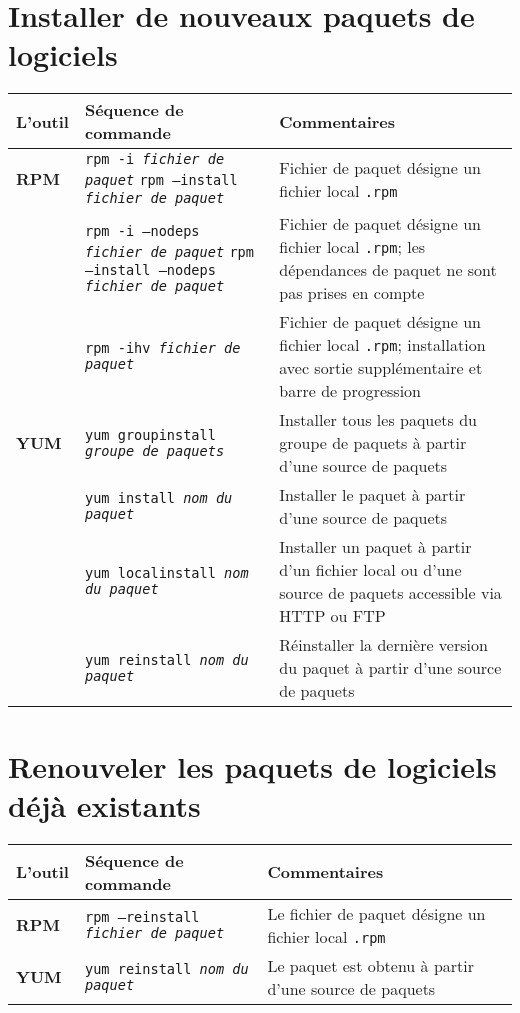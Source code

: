 \documentclass[10pt,a4paper]{article}
\newcommand{\tabellenkopf}{
  \textbf{L'outil} & \textbf{Séquence de commande} & \textbf{Commentaires} \\
}
\begin{document}
\cheatsheet

\section{Installer de nouveaux paquets de logiciels}
\begin{tabular}{ p{3.5cm} p{9cm} p{11cm}}
  \hline
  \rowcolor{Gray}
  \tabellenkopf
  \hline 
  \textbf{RPM} & \texttt{rpm -i \textit{fichier de paquet}} \newline \texttt{rpm --install \textit{fichier de paquet}} & Fichier de paquet désigne un fichier local \texttt{.rpm} \\
  \rowcolor{Gray}
  & \texttt{rpm -i --nodeps \textit{fichier de paquet}} \newline \texttt{rpm --install --nodeps \textit{fichier de paquet}} & Fichier de paquet désigne un fichier local \texttt{.rpm}; les dépendances de paquet ne sont pas prises en compte\\
  & \texttt{rpm -ihv \textit{fichier de paquet}} & Fichier de paquet désigne un fichier local \texttt{.rpm}; installation avec sortie supplémentaire et barre de progression\\
  \rowcolor{Gray}
  \textbf{YUM} & \texttt{yum groupinstall \textit{groupe de paquets}} & Installer tous les paquets du groupe de paquets à partir d'une source de paquets\\
  & \texttt{yum install \textit{nom du paquet}} & Installer le paquet à partir d'une source de paquets\\
  \rowcolor{Gray}
  & \texttt{yum localinstall \textit{nom du paquet}} & Installer un paquet à partir d'un fichier local ou d'une source de paquets accessible via HTTP ou FTP\\
  & \texttt{yum reinstall \textit{nom du paquet}} & Réinstaller la dernière version du paquet à partir d'une source de paquets \\
  \hline
\end{tabular}

\section{Renouveler les paquets de logiciels déjà existants}
\begin{tabular}{ p{3.5cm} p{9cm} p{11cm}}
  \hline
  \rowcolor{Gray}
  \tabellenkopf
  \hline 
  \textbf{RPM} & \texttt{rpm --reinstall \textit{fichier de paquet}} & Le fichier de paquet désigne un fichier local \texttt{.rpm} \\
  \rowcolor{Gray}
  \textbf{YUM} & \texttt{yum reinstall \textit{nom du paquet}} & Le paquet est obtenu à partir d'une source de paquets \\
  \hline
\end{tabular}
\end{document}
